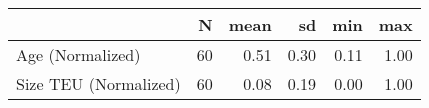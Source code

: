 
\begin{tabular}[t]{lrrrrr}
\toprule
  & N & mean & sd & min & max\\
\midrule
Age (Normalized) & 60 & 0.51 & 0.30 & 0.11 & 1.00\\
Size TEU (Normalized) & 60 & 0.08 & 0.19 & 0.00 & 1.00\\
\bottomrule
\end{tabular}
